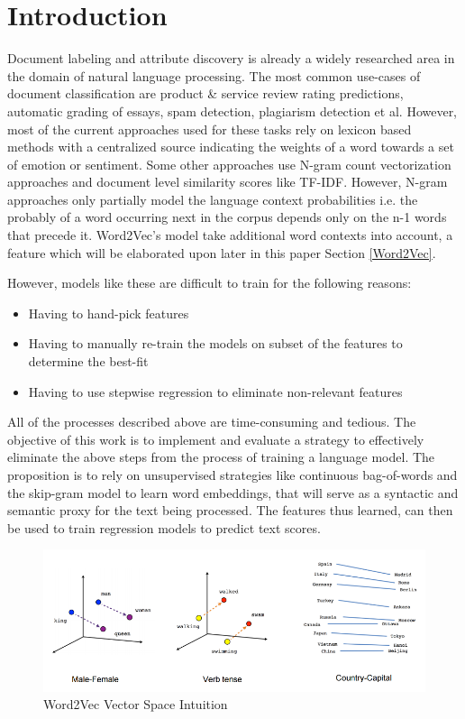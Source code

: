 \documentclass[conference]{IEEEtran}
\begin{document}
\vspace{5mm}

\section{Introduction}
    Document labeling and attribute discovery is already a widely researched area in the domain of natural language processing.
    The most common use-cases of document classification are product \& service review rating predictions, automatic grading of essays, spam detection, plagiarism detection et al.
    However, most of the current approaches used for these tasks rely on lexicon based methods with a centralized source indicating the weights of a word towards a set of emotion or sentiment.
    Some other approaches use N-gram count vectorization approaches and document level similarity scores like TF-IDF.
    However, N-gram approaches only partially model the language context probabilities i.e. the probably of a word occurring next in the corpus depends only on the n-1 words that precede it.
    Word2Vec's model take additional word contexts into account, a feature which will be elaborated upon later in this paper Section \ref{Word2Vec}.

    However, models like these are difficult to train for the following reasons:
    \begin{itemize}
      \item Having to hand-pick features
      \item Having to manually re-train the models on subset of the features to determine the best-fit
      \item Having to use stepwise regression to eliminate non-relevant features
    \end{itemize}

    All of the processes described above are time-consuming and tedious. 
    The objective of this work is to implement and evaluate a strategy to effectively eliminate the above steps from the process of training a language model. 
    The proposition is to rely on unsupervised strategies like continuous bag-of-words and the skip-gram model to learn word embeddings, that will serve as a syntactic and semantic proxy for the text being processed. 
    The features thus learned, can then be used to train regression models to predict text scores.

\begin{figure}[ht] \label{fig:word2vec-vectorspace-intuition}
    \centering
    \includegraphics[width=\textwidth]{images/word2vec_1.png}
    \caption{Word2Vec Vector Space Intuition\cite{tensorflow_word2vec}}
\end{figure}
\end{document}
